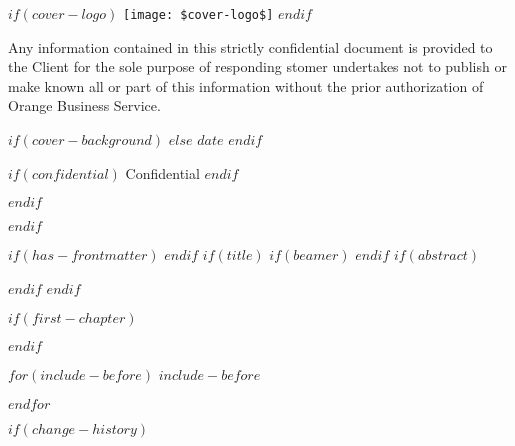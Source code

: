 \documentclass[
$if(fontsize)$
  $fontsize$,
$endif$
$if(papersize)$
  $papersize$paper,
$else$
  paper=a4,
$endif$
$if(beamer)$
  ignorenonframetext,
$if(handout)$
  handout,
$endif$
$if(aspectratio)$
  aspectratio=$aspectratio$,
$endif$
$endif$
$for(classoption)$
  $classoption$$sep$,
$endfor$
  ,captions=tableheading
]{$if(beamer)$$documentclass$$else$$if(book)$scrbook$else$scrartcl$endif$$endif$}
\begin{document}
\begin{titlepage}
\begin{center}
		$if(cover-logo)$
		\noindent
		\texttt{[image: \$cover-logo\$]}
		$endif$
	\end{center}

  {
    \color{primarycolor}
    \begin{flushleft}
    \textsf{Any information contained in this strictly confidential document is provided to the Client for the sole purpose of responding stomer undertakes
     not to publish or make known all or part of this information without the prior authorization of Orange Business Service.}
    \end{flushleft}
  }
  \vspace*{\fill}
	\begin{center}
		$if(cover-background)$
		$else$
		\textsf{$date$}
		$endif$

		$if(confidential)$
      \color{orange}
      {Confidential}
    $endif$
	\end{center}
\end{titlepage}
$endif$


\color{primarycolor}

\restoregeometry
{}
$endif$


$if(has-frontmatter)$
\frontmatter
$endif$
$if(title)$
$if(beamer)$
\frame{\titlepage}
$endif$
$if(abstract)$
\begin{abstract}
	$abstract$
\end{abstract}
$endif$
$endif$

$if(first-chapter)$
\setcounter{chapter}{$first-chapter$}
\addtocounter{chapter}{-1}
$endif$

$for(include-before)$
$include-before$

$endfor$

$if(change-history)$
\end{document}
